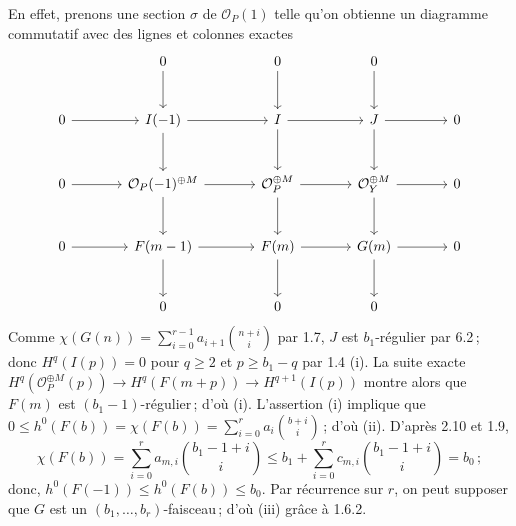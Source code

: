 En effet, prenons une section $\sigma$ de $\mathcal O_P(1)$ telle qu'on obtienne un diagramme commutatif avec des lignes et colonnes exactes
\[
\begin{tikzcd}[column sep=large,row sep=large]
&0 \arrow[d]&0 \arrow[d]&0 \arrow[d]&\\
0 \arrow[r]&I(-1) \arrow[r] \arrow[d]&I \arrow[r] \arrow[d]&J \arrow[r] \arrow[d]&0\\
0 \arrow[r]&\mathcal O_P(-1)^{\oplus M} \arrow[r] \arrow[d]&\mathcal O_P^{\oplus M} \arrow[r] \arrow[d]&\mathcal O_Y^{\oplus M} \arrow[r] \arrow[d]&0\\
0 \arrow[r]&F(m-1) \arrow[r] \arrow[d]&F(m) \arrow[r] \arrow[d]&G(m) \arrow[r] \arrow[d]&0\\
&0&0&0&
\end{tikzcd}
\]
Comme \(\chi(G(n))=\sum_{i=0}^{r-1} a_{i+1}\binom{n+i}{i}\) par 1.7, $J$ est $b_1$-r\'egulier par 6.2\,; donc \(H^q(I(p))=0\) pour $q\ge2$ et $p\ge b_1-q$ par 1.4 (i). La suite exacte \(H^q(\mathcal O_P^{\oplus M}(p))\longrightarrow H^q(F(m+p))\longrightarrow H^{q+1}(I(p))\) montre alors que $F(m)$ est $(b_1-1)$-r\'egulier\,; d'o\`u (i). L'assertion (i) implique que \(0\le h^0(F(b))=\chi(F(b))=\sum_{i=0}^{r}a_i\binom{b+i}{i}\)\,; d'o\`u (ii). D'apr\`es 2.10 et 1.9,
\[
   \chi(F(b))=\sum_{i=0}^{r} a_{m,i}\binom{b_1-1+i}{i}\le b_1+\sum_{i=0}^{r} c_{m,i}\binom{b_1-1+i}{i}=b_0\,;
\]
donc, $h^0(F(-1))\le h^0(F(b))\le b_0$. Par r\'ecurrence sur $r$, on peut supposer que $G$ est un $(b_1,\ldots,b_r)$-faisceau\,; d'o\`u (iii) gr\^ace \`a 1.6.2.

